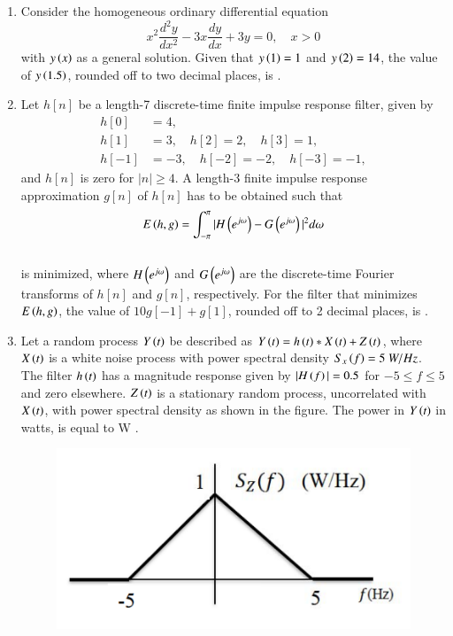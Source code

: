 \documentclass[a4paper, 11pt]{article}
\begin{document}
\begin{enumerate}
    \hfill{}

    \item Consider the homogeneous ordinary differential equation
    \[
    x^{2}\frac{d^{2}y}{dx^{2}}-3x\frac{dy}{dx}+3y=0, \quad x>0
    \]
    with $y\left(x\right)$ as a general solution. Given that $y\left(1\right)=1$ and $y\left(2\right)=14$, the value of $y\left(1.5\right)$, rounded off to two decimal places, is \underline{\hspace{2cm}}.
    
    \hfill{}
    
    \item Let $h[n]$ be a length-7 discrete-time finite impulse response filter, given by
    \begin{align*}
        h[0] &= 4, \\
        h[1] &= 3, \quad h[2]=2, \quad h[3]=1, \\
        h[-1] &= -3, \quad h[-2]=-2, \quad h[-3]=-1,
    \end{align*}
    and $h[n]$ is zero for $|n|\ge4$. A length-3 finite impulse response approximation $g[n]$ of $h[n]$ has to be obtained such that\\\[E\left(h,g\right)=\int_{-\pi}^{\pi}|H\left(e^{j\omega}\right)-G\left(e^{j\omega}\right)|^{2}d\omega\]\\is minimized, where $H\left(e^{j\omega}\right)$ and $G\left(e^{j\omega}\right)$ are the discrete-time Fourier transforms of $h[n]$ and $g[n]$, respectively. For the filter that minimizes $E\left(h,g\right)$, the value of $10g[-1]+g[1]$, rounded off to 2 decimal places, is \underline{\hspace{2cm}}.
    
    \hfill{}
    
    \item Let a random process $Y\left(t\right)$ be described as $Y\left(t\right)=h\left(t\right)*X\left(t\right)+Z\left(t\right)$, where $X\left(t\right)$ is a white noise process with power spectral density $S_{x}\left(f\right)=5~W/Hz$. The filter $h\left(t\right)$ has a magnitude response given by $|H\left(f\right)|=0.5$ for $-5\le f\le5$ and zero elsewhere. $Z\left(t\right)$ is a stationary random process, uncorrelated with $X\left(t\right)$, with power spectral density as shown in the figure. The power in $Y\left(t\right)$ in watts, is equal to \underline{\hspace{2cm}} W .
    
    \begin{figure}[H]
        \centering
        \includegraphics[width=0.6\columnwidth]{figs/q45.png}
        \caption*{}
        \label{fig:q45}
    \end{figure}
    

\end{enumerate}
\end{document}
